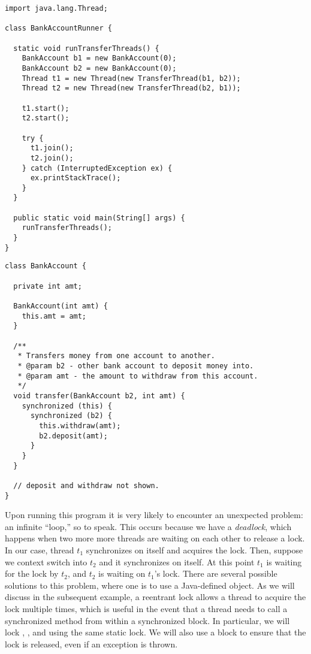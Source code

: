 \begin{lstlisting}[language=MyJava]
import java.lang.Thread;

class BankAccountRunner {

  static void runTransferThreads() {
    BankAccount b1 = new BankAccount(0);
    BankAccount b2 = new BankAccount(0);
    Thread t1 = new Thread(new TransferThread(b1, b2));
    Thread t2 = new Thread(new TransferThread(b2, b1));

    t1.start();
    t2.start();

    try {
      t1.join();
      t2.join();
    } catch (InterruptedException ex) { 
      ex.printStackTrace(); 
    }
  }

  public static void main(String[] args) {
    runTransferThreads();
  }
}
\end{lstlisting}

\begin{lstlisting}[language=MyJava]
class BankAccount {

  private int amt;

  BankAccount(int amt) { 
    this.amt = amt; 
  }

  /**
   * Transfers money from one account to another.
   * @param b2 - other bank account to deposit money into.
   * @param amt - the amount to withdraw from this account.
   */
  void transfer(BankAccount b2, int amt) {
    synchronized (this) {
      synchronized (b2) {
        this.withdraw(amt);
        b2.deposit(amt);
      }
    }
  }

  // deposit and withdraw not shown.
}
\end{lstlisting}

Upon running this program it is very likely to encounter an unexpected problem: an infinite ``loop,'' so to speak. This occurs because we have a \emph{deadlock}, which happens when two more more threads are waiting on each other to release a lock. In our case, thread $t_1$ synchronizes on itself and acquires the lock. Then, suppose we context switch into $t_2$ and it synchronizes on itself. At this point $t_1$ is waiting for the lock by $t_2$, and $t_2$ is waiting on $t_1$'s lock. There are several possible solutions to this problem, where one is to use a Java-defined  object. As we will discuss in the subsequent example, a reentrant lock allows a thread to acquire the lock multiple times, which is useful in the event that a thread needs to call a synchronized method from within a synchronized block. In particular, we will lock , , and  using the same static lock. We will also use a  block to ensure that the lock is released, even if an exception is thrown.

